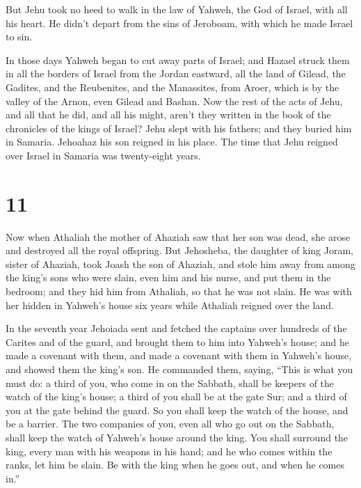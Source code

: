  But Jehu took no heed to walk in the law of Yahweh, the
God of Israel, with all his heart. He didn't depart from the sins of
Jeroboam, with which he made Israel to sin.

 In those days Yahweh began to cut away parts of Israel;
and Hazael struck them in all the borders of Israel  from
the Jordan eastward, all the land of Gilead, the Gadites, and the
Reubenites, and the Manassites, from Aroer, which is by the valley of
the Arnon, even Gilead and Bashan.  Now the rest of the
acts of Jehu, and all that he did, and all his might, aren't they
written in the book of the chronicles of the kings of Israel?
 Jehu slept with his fathers; and they buried him in
Samaria. Jehoahaz his son reigned in his place.  The time
that Jehu reigned over Israel in Samaria was twenty-eight years.

\hypertarget{section-10}{%
\section{11}\label{section-10}}

 Now when Athaliah the mother of Ahaziah saw that her son
was dead, she arose and destroyed all the royal offspring. 
But Jehosheba, the daughter of king Joram, sister of Ahaziah, took Joash
the son of Ahaziah, and stole him away from among the king's sons who
were slain, even him and his nurse, and put them in the bedroom; and
they hid him from Athaliah, so that he was not slain.  He
was with her hidden in Yahweh's house six years while Athaliah reigned
over the land.

 In the seventh year Jehoiada sent and fetched the captains
over hundreds of the Carites and of the guard, and brought them to him
into Yahweh's house; and he made a covenant with them, and made a
covenant with them in Yahweh's house, and showed them the king's son.
 He commanded them, saying, ``This is what you must do: a
third of you, who come in on the Sabbath, shall be keepers of the watch
of the king's house;  a third of you shall be at the gate
Sur; and a third of you at the gate behind the guard. So you shall keep
the watch of the house, and be a barrier.  The two companies
of you, even all who go out on the Sabbath, shall keep the watch of
Yahweh's house around the king.  You shall surround the
king, every man with his weapons in his hand; and he who comes within
the ranks, let him be slain. Be with the king when he goes out, and when
he comes in.''

